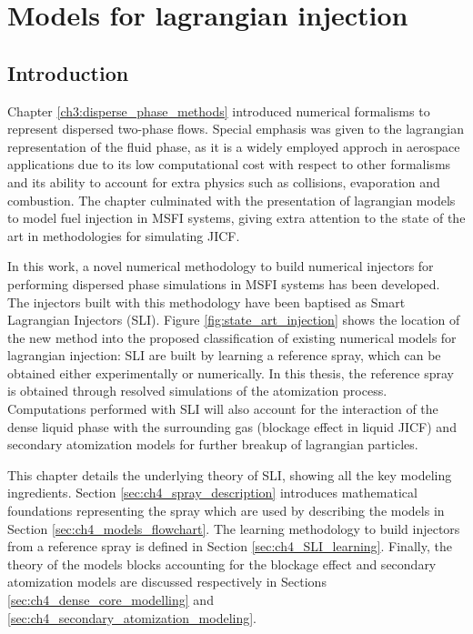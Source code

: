 \chapter{Models for lagrangian injection}
	\label{ch4:sli_development}

\section{Introduction}

Chapter \ref{ch3:disperse_phase_methods} introduced numerical formalisms to represent dispersed two-phase flows. Special emphasis was given to the lagrangian representation of the fluid phase, as it is a widely employed approch in aerospace applications due to its low computational cost with respect to other formalisms and its ability to account for extra physics such as collisions, evaporation and combustion. The chapter culminated with the presentation of lagrangian models to model fuel injection in MSFI systems, giving extra attention to the state of the art in methodologies for simulating JICF. 

In this work, a novel numerical methodology to build numerical injectors for performing dispersed phase simulations in MSFI systems has been developed. The injectors built with this methodology have been baptised as Smart Lagrangian Injectors (SLI). Figure \ref{fig:state_art_injection} shows the location of the new method into the proposed classification of existing numerical models for lagrangian injection: SLI are built by learning a reference spray, which can be obtained either experimentally or numerically. In this thesis, the reference spray is obtained through resolved simulations of the atomization process. Computations performed with SLI will also account for the interaction of the dense liquid phase with the surrounding gas (blockage effect in liquid JICF) and secondary atomization models for further breakup of lagrangian particles.

This chapter details the underlying theory of SLI, showing all the key modeling ingredients. Section \ref{sec:ch4_spray_description} introduces mathematical foundations representing the spray which are used by describing the models in Section \ref{sec:ch4_models_flowchart}. The learning methodology to build injectors from a reference spray is defined in Section \ref{sec:ch4_SLI_learning}. Finally, the theory of the models blocks accounting for the blockage effect and secondary atomization models are discussed respectively in Sections \ref{sec:ch4_dense_core_modelling} and \ref{sec:ch4_secondary_atomization_modeling}.
 

